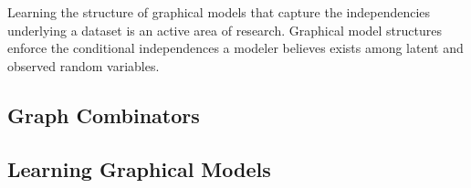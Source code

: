 \documentclass{article} %
\begin{document}
Learning the structure of graphical models that capture the independencies underlying a dataset is an active area of research\cite{adams-wallach-ghahramani-2010a}\cite{ISI:000240797500002}\cite{ISI:000178037200004}\cite{ISI:A1995RX35400001}. Graphical model structures enforce the conditional independences a modeler believes exists among latent and observed random variables\cite{DBLP:books/daglib/0066829}. 

\subsection{Graph Combinators}

\subsection{Learning Graphical Models}
\end{document}
